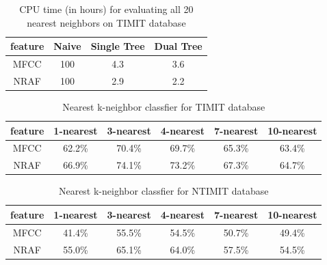 \documentclass[12pt,letterpaper,doublespaced,ETD,dvips,proposal]{gtthesis}
\begin{document}
\begin{Body}

\begin{table}[!htb]
\footnotesize{ \centering
\begin{tabular}{|c|c|c|c|}
  \hline
  feature & Naive & Single Tree & Dual Tree \\
  \hline
  MFCC & 100 & 4.3 & 3.6 \\
  NRAF & 100 & 2.9 & 2.2 \\
  \hline
\end{tabular}
 \caption {CPU time (in hours) for evaluating all 20 nearest neighbors on
  TIMIT database}
  }
  \label{timing}
\end{table}

\begin{table}[!htb]
\footnotesize{ \centering
\begin{tabular}{|c|c|c|c|c|c|}
  \hline
  feature & 1-nearest & 3-nearest & 4-nearest & 7-nearest & 10-nearest \\
  \hline
  MFCC & 62.2\% & 70.4\% & 69.7\% & 65.3\% & 63.4\% \\
  NRAF & 66.9\% & 74.1\% & 73.2\% & 67.3\% & 64.7\% \\
  \hline
\end{tabular}
\caption{Nearest k-neighbor classfier for TIMIT database} }
\label{kneighborTIMIT}
\end{table}

\begin{table}[!htb]
\footnotesize{ \centering
\begin{tabular}{|c|c|c|c|c|c|}
  \hline
  feature & 1-nearest & 3-nearest & 4-nearest & 7-nearest & 10-nearest \\
  \hline
  MFCC & 41.4\% & 55.5\% & 54.5\% & 50.7\% & 49.4\% \\
  NRAF & 55.0\% & 65.1\% & 64.0\% & 57.5\% & 54.5\% \\
  \hline
\end{tabular}
\caption{Nearest k-neighbor classfier for NTIMIT database} }
\label{kneighborNTIMIT}
\end{table}


\end{Body}
\end{document}
